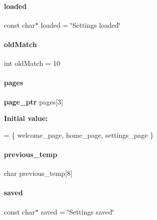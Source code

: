 \mbox{\label{a00038_a040c589558f4195d2ba58a9f297cb3eb}} 
\paragraph{loaded}
{\footnotesize\ttfamily const char$\ast$ loaded = \char`\"{}Settings loaded\char`\"{}}

\mbox{\label{a00038_a618c9ac6927b7a3dbfafc45840c0bbba}} 
\paragraph{old\+Match}
{\footnotesize\ttfamily int old\+Match = 10}

\mbox{\label{a00038_a210daff3ebb00fce7bbc352084aefd18}} 
\paragraph{pages}
{\footnotesize\ttfamily \textbf{ page\+\_\+ptr} pages[3]}

{\bfseries Initial value\+:}
\begin{DoxyCode}
= \{
                     welcome_page,
                     home_page, settings_page
\}
\end{DoxyCode}
\mbox{\label{a00038_af60039f6b7db05855c68ac3cf44ecec1}} 
\paragraph{previous\+\_\+temp}
{\footnotesize\ttfamily char previous\+\_\+temp[8]}

\mbox{\label{a00038_af3ff9fb0595b9a1d25efd15d5692ad5a}} 
\paragraph{saved}
{\footnotesize\ttfamily const char$\ast$ saved = \char`\"{}Settings saved\char`\"{}}

\mbox{\label{a00038_a0df696e97fa7851678660922afea1a0b}} 
